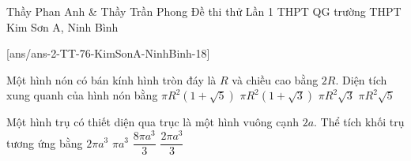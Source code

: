 \begin{name}
{Thầy Phan Anh \& Thầy Trần Phong }
{Đề thi thử Lần 1 THPT QG trường THPT Kim Sơn A, Ninh Bình}
\end{name}
\setcounter{ex}{0}\setcounter{bt}{0}
[ans/ans-2-TT-76-KimSonA-NinhBinh-18]

\begin{ex}%
Một hình nón  có bán kính hình tròn đáy là $R$ và chiều cao bằng $2R$. Diện tích xung quanh của hình nón bằng 
\choice
{$\pi R^2(1+\sqrt{5})$}
{$\pi R^2(1+\sqrt{3})$}
{$\pi R^2\sqrt{3}$}
{\True $\pi R^2\sqrt{5}$}
\end{ex}
\begin{ex}%
Một hình trụ có thiết diện qua trục là một hình vuông cạnh $2a$. Thể tích khối trụ tương ứng bằng 	
	\choice
	{\True $ 2\pi a^3 $}
	{$ \pi a^3 $}
	{$ \dfrac{8\pi a^3}{3} $}
	{$ \dfrac{2\pi a^3}{3} $}
\end{ex}

